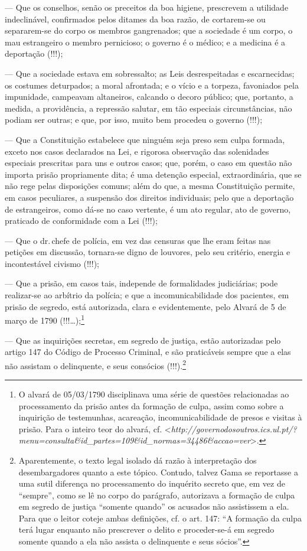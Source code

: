 --- Que os conselhos, senão os preceitos da boa higiene, prescrevem a
  utilidade indeclinável, confirmados pelos ditames da boa razão, de
  cortarem-se ou separarem-se do corpo os membros gangrenados; que a
  sociedade é um corpo, o mau estrangeiro o membro pernicioso; o governo
  é o médico; e a medicina é a deportação (!!!);

--- Que a sociedade estava em sobressalto; as Leis desrespeitadas e
  escarnecidas; os costumes deturpados; a moral afrontada; e o vício e a
  torpeza, favoniados pela impunidade, campeavam altaneiros, calcando o
  decoro público; que, portanto, a medida, a providência, a repressão
  salutar, em tão especiais circunstâncias, não podiam ser
  outras; e que, por isso, muito bem procedeu o governo (!!!);

--- Que a Constituição estabelece que ninguém seja preso sem culpa
  formada, exceto nos casos declarados na Lei, e rigorosa observação das
  solenidades especiais prescritas para uns e outros casos; que, porém,
  o caso em questão não importa prisão propriamente dita; é uma detenção
  especial, extraordinária, que se não rege pelas disposições comuns;
  além do que, a mesma Constituição permite, em casos peculiares, a
  suspensão dos direitos individuais; pelo que a deportação de
  estrangeiros, como dá-se no caso vertente, é um ato regular, ato de
  governo, praticado de conformidade com a Lei (!!!);

--- Que o dr.\,chefe de polícia, em vez das censuras que lhe eram feitas
  nas petições em discussão, tornara-se digno de louvores, pelo seu
  critério, energia e incontestável civismo (!!!);

--- Que a prisão, em casos tais, independe de formalidades judiciárias;
  pode realizar-se ao arbítrio da polícia; e que a incomunicabilidade
  dos pacientes, em prisão de segredo, está autorizada, clara e
  evidentemente, pelo Alvará de 5 de março de 1790 (!!!\ldots{});\footnote{
    O alvará de 05/03/1790 disciplinava uma série de questões
    relacionadas ao processamento da prisão antes da formação de culpa,
    assim como sobre a inquirição de testemunhas, acareação,
    incomunicabilidade de presos e visitas à prisão. Para o inteiro teor
    do alvará, cf.
    \textless{}\emph{http://governodosoutros.ics.ul.pt/?menu=consulta\&id\_partes=109\&id\_normas=34486\&accao=ver}\textgreater{}.}

--- Que as inquirições secretas, em segredo de justiça, estão
  autorizadas pelo artigo 147 do Código de Processo Criminal, e são
  praticáveis sempre que a elas não assistam o delinquente, e seus
  consócios (!!!).\footnote{Aparentemente, o texto legal isolado dá
    razão à interpretação dos desembargadores quanto a este tópico.
    Contudo, talvez Gama se reportasse a uma sutil diferença no
    processamento do inquérito secreto que, em vez de ``sempre'', como
    se lê no corpo do parágrafo, autorizava a formação de culpa em
    segredo de justiça ``somente quando'' os acusados não assistissem a
    ela. Para que o leitor coteje ambas definições, cf. o art. 147: ``A
    formação da culpa terá lugar enquanto não prescrever o delito e
    proceder-se-á em segredo somente quando a ela não assista o
    delinquente e seus sócios''.}

